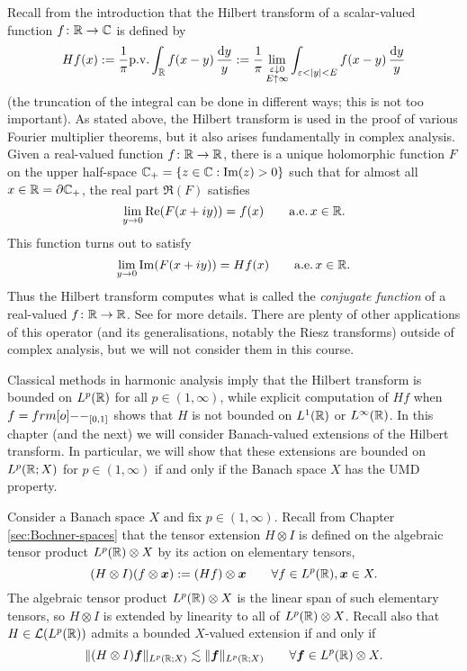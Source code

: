 Recall from the introduction that the Hilbert transform of a scalar-valued function $f \colon \mathbb{R} \rightarrow \mathbb{C}$ is defined by
\begin{equation*}
  Hf(x) := \frac{1}{\pi} \mathrm{p. v.} \int_{\mathbb{R}} f(x-y) \, \frac{\mathrm{d} y}{y} := \frac{1}{\pi} \lim_{\substack{\varepsilon \downarrow 0 \\ E \uparrow \infty}} \int_{\varepsilon < |y| < E} f(x-y) \, \frac{\mathrm{d} y}{y}
\end{equation*}
(the truncation of the integral can be done in different ways; this is not too important).
As stated above, the Hilbert transform is used in the proof of various Fourier multiplier theorems, but it also arises fundamentally in complex analysis.
Given a real-valued function $f \colon \mathbb{R} \rightarrow \mathbb{R}$, there is a unique holomorphic function $F$ on the upper half-space $\mathbb{C}_{+} = \{z \in \mathbb{C} : \mathrm{Im}(z) > 0\}$ such that for almost all $x \in \mathbb{R} = \partial \mathbb{C}_{+}$, the real part $\Re(F)$ satisfies
\begin{equation*}
  \lim_{y \to 0} \mathrm{Re}(F(x+iy)) = f(x) \qquad \mathrm{a.e.} \,  x \in \mathbb{R}.
\end{equation*}
This function turns out to satisfy
\begin{equation*}
  \lim_{y \to 0} \mathrm{Im}(F(x+iy)) = Hf(x)  \qquad \mathrm{a.e.} \,  x \in \mathbb{R}.
\end{equation*}
Thus the Hilbert transform computes what is called the \emph{conjugate function} of a real-valued $f \colon \mathbb{R} \rightarrow \mathbb{R}$.
See \cite[.2]{grafakos} for more details.
There are plenty of other applications of this operator (and its generalisations, notably the Riesz transforms) outside of complex analysis, but we will not consider them in this course.

Classical methods in harmonic analysis imply that the Hilbert transform is bounded on $L^p(\mathbb{R})$ for all $p \in (1,\infty)$, while explicit computation of $Hf$ when $f = \1_{[0,1]}$ shows that $H$ is not bounded on $L^1(\mathbb{R})$ or $L^\infty(\mathbb{R})$.
In this chapter (and the next) we will consider Banach-valued extensions of the Hilbert transform.
In particular, we will show that these extensions are bounded on $L^p(\mathbb{R};X)$ for $p \in (1,\infty)$ if and only if the Banach space $X$ has the UMD property.

Consider a Banach space $X$ and fix $p \in (1,\infty)$.
Recall from Chapter \ref{sec:Bochner-spaces} that the tensor extension $H \otimes I$ is defined on the algebraic tensor product $L^p(\mathbb{R}) \otimes X$ by its action on elementary tensors,
\begin{equation*}
  (H \otimes I)(f \otimes \bm{x}) := (Hf) \otimes \bm{x} \qquad \forall f \in L^p(\mathbb{R}), \bm{x} \in X.
\end{equation*}
The algebraic tensor product $L^p(\mathbb{R}) \otimes X$ is the linear span of such elementary tensors, so $H \otimes I$ is extended by linearity to all of $L^p(\mathbb{R}) \otimes X$.
Recall also that $H \in \mathcal{L}(L^p(\mathbb{R}))$ admits a bounded $X$-valued extension if and only if
\begin{equation*}
  \|(H \otimes I)\bm{f}\|_{L^p(\mathbb{R};X)} \lesssim \|\bm{f}\|_{L^p(\mathbb{R};X)} \qquad \forall \bm{f} \in L^p(\mathbb{R}) \otimes X.
\end{equation*}

